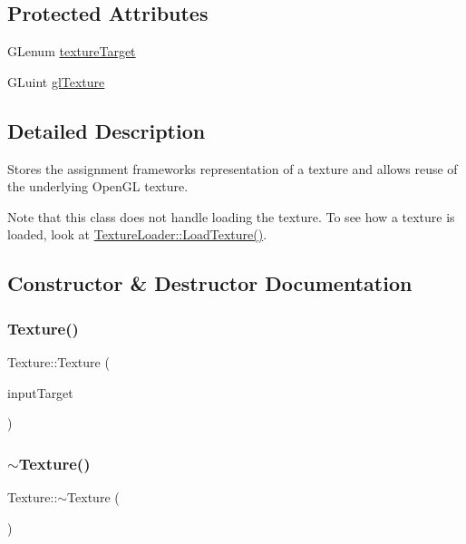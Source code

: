 \subsection*{Protected Attributes}
\begin{DoxyCompactItemize}
\item
G\+Lenum \hyperlink{class_texture_a743402dc306a143404ee2d246d864fb7}{texture\+Target}
\item
G\+Luint \hyperlink{class_texture_adbf320788255a426a0a60e35cd969bcd}{gl\+Texture}
\end{DoxyCompactItemize}


\subsection{Detailed Description}
Stores the assignment framework\textquotesingle{}s representation of a texture and allows reuse of the underlying Open\+GL texture.

Note that this class does not handle loading the texture. To see how a texture is loaded, look at \hyperlink{namespace_texture_loader_aed2af32d44d07368f1f426c4274418c0}{Texture\+Loader\+::\+Load\+Texture()}.

\subsection{Constructor \& Destructor Documentation}
\hypertarget{class_texture_aa9661e01f3c034c259c15b619e2cea55}{}\label{class_texture_aa9661e01f3c034c259c15b619e2cea55}
\subsubsection{\texorpdfstring{Texture()}{Texture()}}
{\footnotesize\ttfamily Texture\+::\+Texture (\begin{DoxyParamCaption}\item[{G\+Lenum}]{input\+Target }\end{DoxyParamCaption})}

\hypertarget{class_texture_a09c4bcb7462f64c1d20fa69dba3cee8a}{}\label{class_texture_a09c4bcb7462f64c1d20fa69dba3cee8a}
\subsubsection{\texorpdfstring{$\sim$\+Texture()}{~Texture()}}
{\footnotesize\ttfamily Texture\+::$\sim$\+Texture (\begin{DoxyParamCaption}{ }\end{DoxyParamCaption})\hspace{0.3cm}{\ttfamily [virtual]}}




